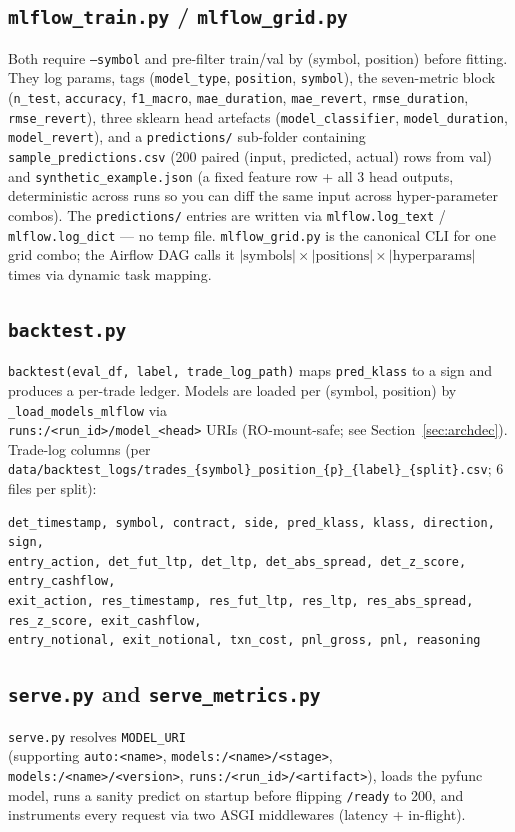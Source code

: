 \documentclass[11pt,a4paper]{article}
\begin{document}
\subsection{\texttt{mlflow\_train.py} / \texttt{mlflow\_grid.py}}
Both require \texttt{--symbol} and pre-filter train/val by (symbol, position) before fitting. They log params, tags (\texttt{model\_type}, \texttt{position}, \texttt{symbol}), the seven-metric block (\texttt{n\_test}, \texttt{accuracy}, \texttt{f1\_macro}, \texttt{mae\_duration}, \texttt{mae\_revert}, \texttt{rmse\_duration}, \texttt{rmse\_revert}), three sklearn head artefacts (\texttt{model\_classifier}, \texttt{model\_duration}, \texttt{model\_revert}), and a \texttt{predictions/} sub-folder containing \texttt{sample\_predictions.csv} (200 paired (input, predicted, actual) rows from val) and \texttt{synthetic\_example.json} (a fixed feature row + all 3 head outputs, deterministic across runs so you can diff the same input across hyper-parameter combos). The \texttt{predictions/} entries are written via \texttt{mlflow.log\_text} / \texttt{mlflow.log\_dict} --- no temp file. \texttt{mlflow\_grid.py} is the canonical CLI for one grid combo; the Airflow DAG calls it $|\text{symbols}| \times |\text{positions}| \times |\text{hyperparams}|$ times via dynamic task mapping.

\subsection{\texttt{backtest.py}}
\texttt{backtest(eval\_df, label, trade\_log\_path)} maps \texttt{pred\_klass} to a sign and produces a per-trade ledger. Models are loaded per (symbol, position) by \texttt{\_load\_models\_mlflow} via
\\
\texttt{runs:/<run\_id>/model\_<head>} URIs (RO-mount-safe; see Section~\ref{sec:archdec}). 
Trade-log columns     (per \texttt{data/backtest\_logs/trades\_\{symbol\}\_position\_\{p\}\_\{label\}\_\{split\}.csv}; 6 files per split):
\begin{lstlisting}[style=bashstyle]
det_timestamp, symbol, contract, side, pred_klass, klass, direction, sign,
entry_action, det_fut_ltp, det_ltp, det_abs_spread, det_z_score, entry_cashflow,
exit_action, res_timestamp, res_fut_ltp, res_ltp, res_abs_spread, res_z_score, exit_cashflow,
entry_notional, exit_notional, txn_cost, pnl_gross, pnl, reasoning
\end{lstlisting}

\subsection{\texttt{serve.py} and \texttt{serve\_metrics.py}}
\texttt{serve.py} resolves \texttt{MODEL\_URI} 
\\
(supporting \texttt{auto:<name>}, \texttt{models:/<name>/<stage>}, \texttt{models:/<name>/<version>}, \texttt{runs:/<run\_id>/<artifact>}), loads the pyfunc model, runs a sanity predict on startup before flipping \texttt{/ready} to 200, and instruments every request via two ASGI middlewares (latency + in-flight).
\end{document}
